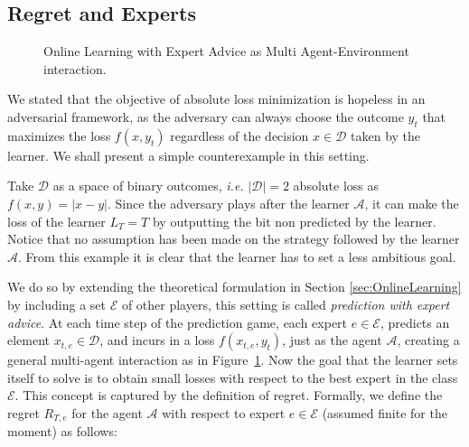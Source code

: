 


\subsection{Regret and Experts}
\begin{figure}[t!]
\centering

\caption{Online Learning with Expert Advice as Multi Agent-Environment interaction.}
\label{fig:OL}
\end{figure}
We stated that the objective of absolute loss minimization is hopeless in an adversarial framework, as the adversary can always choose the outcome $y_t$ that maximizes the loss $f(x,y_t)$ regardless of the decision $x\in\mathcal D$ taken by the learner. We shall present a simple counterexample in this setting.

Take $\mathcal D$ as a space of binary outcomes, \emph{i.e.} $|\mathcal D|=2$ absolute loss as $f(x,y)=|x - y|$. Since the adversary plays after the learner $\mathcal A$, it can  make the loss of the learner $L_T=T$ by outputting the bit non predicted by the learner. Notice that no assumption has been made on the strategy followed by the learner $\mathcal A$.
From this example it is clear that the learner has to set a less ambitious goal.

We do so by extending the theoretical formulation in Section \ref{sec:OnlineLearning} by including a set $\mathcal E$ of other players, this setting is called \emph{prediction with expert advice}. At each time step of the prediction game, each expert $e\in\mathcal E$, predicts an element $x_{t,e}\in\mathcal D$, and incurs in a loss $f(x_{t,e},y_t)$, just as the agent $\mathcal A$, creating a general multi-agent interaction as in Figure~\ref{fig:OL}. 
Now the goal that the learner sets itself to solve is to obtain small losses with respect to the best expert in the class $\mathcal E$. This concept is captured by the definition of regret.
Formally, we define the regret $R_{T,e}$ for the agent $\mathcal A$ with respect to expert $e\in\mathcal E$ (assumed finite for the moment) as follows:

